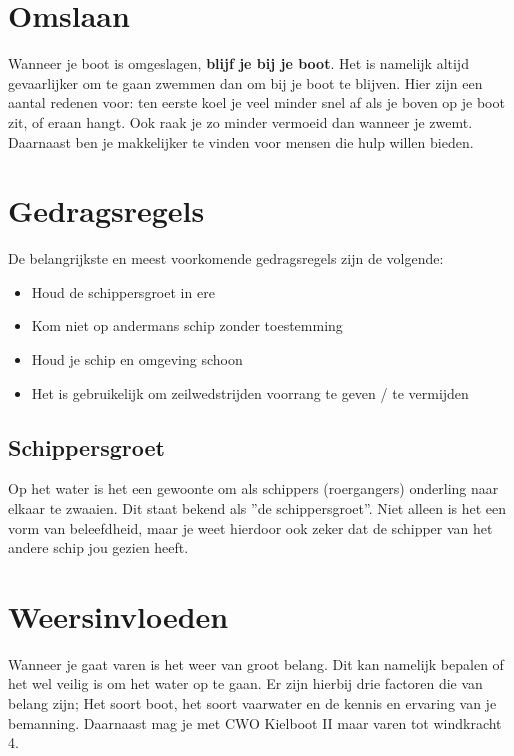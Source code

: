 \section{Omslaan}
Wanneer je boot is omgeslagen, \textbf{blijf je bij je boot}. Het is namelijk altijd gevaarlijker om te gaan zwemmen dan om bij je boot te blijven. Hier zijn een aantal redenen voor: ten eerste koel je veel minder snel af als je boven op je boot zit, of eraan hangt. Ook raak je zo minder vermoeid dan wanneer je zwemt. Daarnaast ben je makkelijker te vinden voor mensen die hulp willen bieden.
\section{Gedragsregels}
De belangrijkste en meest voorkomende gedragsregels zijn de volgende:
\begin{itemize}
    \item Houd de schippersgroet in ere
    \item Kom niet op andermans schip zonder toestemming
    \item Houd je schip en  omgeving schoon
    \item Het is gebruikelijk om zeilwedstrijden voorrang te geven / te vermijden
\end{itemize}
\subsection*{Schippersgroet}
Op het water is het een gewoonte om als schippers (roergangers) onderling naar elkaar te zwaaien. Dit staat bekend als ''de schippersgroet''. Niet alleen is het een vorm van beleefdheid, maar je weet hierdoor ook zeker dat de schipper van het andere schip jou gezien heeft. 

\section{Weersinvloeden}
Wanneer je gaat varen is het weer van groot belang. Dit kan namelijk bepalen of het wel veilig is om het water op te gaan. Er zijn hierbij drie factoren die van belang zijn; Het soort boot, het soort vaarwater en de kennis en ervaring van je bemanning. Daarnaast mag je met CWO Kielboot II maar varen tot windkracht 4.

